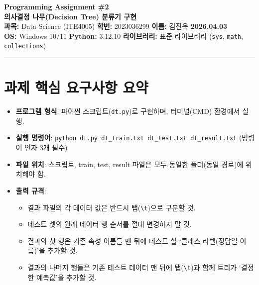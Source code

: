 \documentclass[12pt, a4paper]{article}
\begin{document}
\begin{center}
    {\Large\bfseries Programming Assignment \#2}\\[0.4em]
    {\large\bfseries 의사결정 나무(Decision Tree) 분류기 구현}\\[1em]
    {\normalsize
        \textbf{과목:} Data Science (ITE4005) \quad
        \textbf{학번:} 2023036299 \quad
        \textbf{이름:} 김진욱 \quad
        \textbf{2026.04.03}\\[0.3em]
        \textbf{OS:} Windows 10/11 \quad
        \textbf{Python:} 3.12.10 \quad
        \textbf{라이브러리:} 표준 라이브러리 (\texttt{sys}, \texttt{math}, \texttt{collections})
    }
\end{center}
\vspace{0.5em}
\hrule
\vspace{1em}

\section{과제 핵심 요구사항 요약}

\begin{itemize}
    \item \textbf{프로그램 형식}: 파이썬 스크립트(\texttt{dt.py})로 구현하며, 터미널(CMD) 환경에서 실행.
    \item \textbf{실행 명령어}: \texttt{python dt.py dt\_train.txt dt\_test.txt dt\_result.txt} (명령어 인자 3개 필수)
    \item \textbf{파일 위치}: 스크립트, train, test, result 파일은 모두 동일한 폴더(동일 경로)에 위치해야 함.
    \item \textbf{출력 규격}:
    \begin{itemize}
        \item 결과 파일의 각 데이터 값은 반드시 탭(\texttt{\textbackslash t})으로 구분할 것.
        \item 테스트 셋의 원래 데이터 행 순서를 절대 변경하지 말 것.
        \item 결과의 첫 행은 기존 속성 이름들 맨 뒤에 테스트 할 `클래스 라벨(정답열 이름)'을 추가할 것.
        \item 결과의 나머지 행들은 기존 테스트 데이터 맨 뒤에 탭(\texttt{\textbackslash t})과 함께 트리가 `결정한 예측값'을 추가할 것.
    \end{itemize}
\end{itemize}
\end{document}
